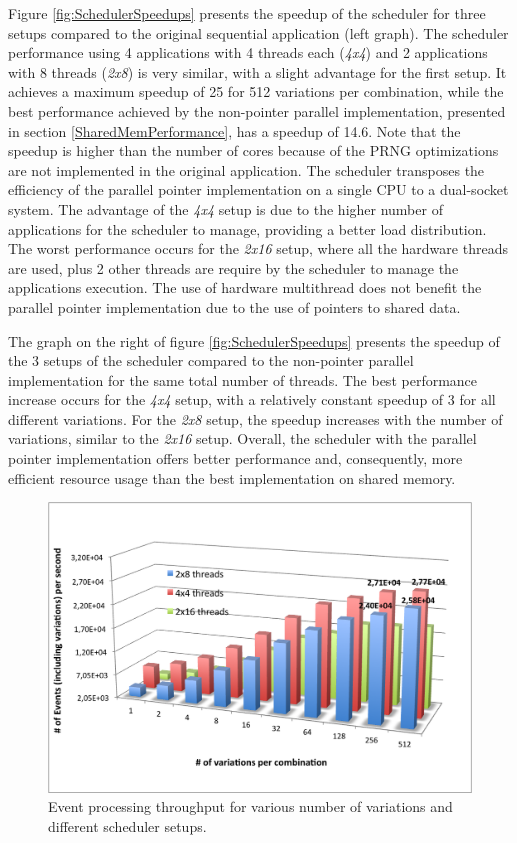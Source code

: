 Figure \ref{fig:SchedulerSpeedups} presents the speedup of the scheduler for three setups compared to the original sequential application (left graph). The scheduler performance using 4 applications with 4 threads each (\textit{4x4}) and 2 applications with 8 threads (\textit{2x8}) is very similar, with a slight advantage for the first setup. It achieves a maximum speedup of 25 for 512 variations per combination, while the best performance achieved by the non-pointer parallel implementation, presented in section \ref{SharedMemPerformance}, has a speedup of 14.6. Note that the speedup is higher than the number of cores because of the PRNG optimizations are not implemented in the original application. The scheduler transposes the efficiency of the parallel pointer implementation on a single CPU to a dual-socket system. The advantage of the \textit{4x4} setup is due to the higher number of applications for the scheduler to manage, providing a better load distribution. The worst performance occurs for the \textit{2x16} setup, where all the hardware threads are used, plus 2 other threads are require by the scheduler to manage the applications execution. The use of hardware multithread does not benefit the parallel pointer implementation due to the use of pointers to shared data.

The graph on the right of figure \ref{fig:SchedulerSpeedups} presents the speedup of the 3 setups of the scheduler compared to the non-pointer parallel implementation for the same total number of threads. The best performance increase occurs for the \textit{4x4} setup, with a relatively constant speedup of 3 for all different variations. For the \textit{2x8} setup, the speedup increases with the number of variations, similar to the \textit{2x16} setup. Overall, the scheduler with the parallel pointer implementation offers better performance and, consequently, more efficient resource usage than the best implementation on shared memory.

\begin{figure}[!htp]
	\begin{center}
		\includegraphics[scale=0.7]{../../common/graphs/throughput_scheduler.png}
		\caption{Event processing throughput for various number of variations and different scheduler setups.}
		\label{fig:SchedulerThroughput}
	\end{center}
\end{figure}


